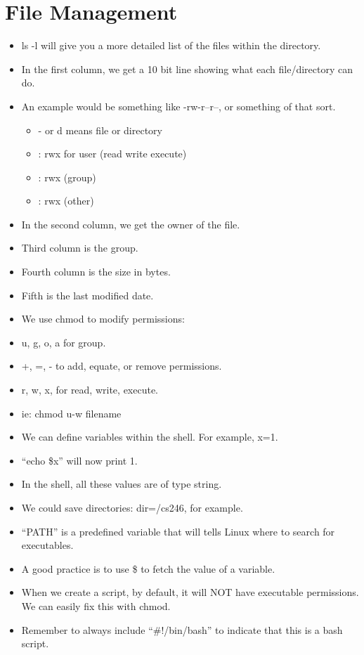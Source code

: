 \documentclass{article}
\begin{document}
\section{File Management}
\begin{itemize}
\item ls -l will give you a more detailed list of the files within the directory.
\item In the first column, we get a 10 bit line showing what each file/directory can do.
\item An example would be something like -rw-r--r--, or something of that sort.
\begin{itemize}
\item - or d means file or directory
\item \-\-\-: rwx for user (read write execute)
\item \-\-\-: rwx (group)
\item \-\-\-: rwx (other)
\end{itemize}
\item In the second column, we get the owner of the file.
\item Third column is the group.
\item Fourth column is the size in bytes.
\item Fifth is the last modified date.
\item We use chmod to modify permissions:
\item u, g, o, a for group.
\item +, =, - to add, equate, or remove permissions.
\item r, w, x, for read, write, execute.
\item ie: chmod u-w filename
\item We can define variables within the shell.  For example, x=1.
\item “echo \${x}” will now print 1.
\item In the shell, all these values are of type string.
\item We could save directories: dir=\texttildelow/cs246, for example.
\item ``PATH'' is a predefined variable that will tells Linux where to search for executables.
\item A good practice is to use \${} to fetch the value of a variable.
\item When we create a script, by default, it will NOT have executable permissions.  We can easily fix this with chmod.
\item Remember to always include ``\#!/bin/bash'' to indicate that this is a bash script.

\end{itemize}
\end{document}

